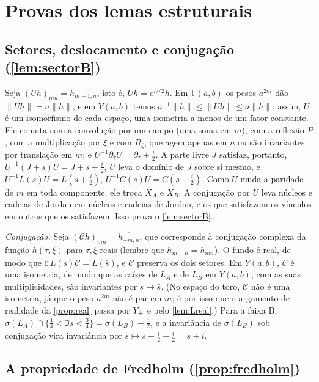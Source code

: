 \section{Provas dos lemas estruturais}\label{app:lemmas}

\subsection{Setores, deslocamento e conjugação (\cref{lem:sectorB})}\label{app:sectors}

Seja $(Uh)_{mn}=h_{m-1,n}$, isto é, $Uh=e^{i\tau/2}h$. Em $\mathbb T(a,b)$ os pesos $a^{2m}$ dão
$\|Uh\|=a\|h\|$, e em $Y(a,b)$ temos $a^{-1}\|h\|\le\|Uh\|\le a\|h\|$; assim, $U$ é um isomorfismo de cada espaço,
uma isometria a menos de um fator constante. Ele comuta com a convolução por um campo (uma soma em $m$), com a reflexão
$P$, com a multiplicação por $\xi$ e com $R_\xi$, que agem apenas em $n$ ou são invariantes por translação em
$m$; e $U^{-1}\partial_\tau U=\partial_\tau+\tfrac i2$. A parte livre $J$ satisfaz, portanto,
$U^{-1}(J+s)U=J+s+\tfrac i2$, $U$ leva o domínio de $J$ sobre si mesmo, e $U^{-1}L(s)U=L(s+\tfrac i2)$,
$U^{-1}C(s)U=C(s+\tfrac i2)$. Como $U$ muda a paridade de $m$ em toda componente, ele troca $X_A$ e $X_B$.
A conjugação por $U$ leva núcleos e cadeias de Jordan em núcleos e cadeias de Jordan, e os que satisfazem os vínculos em
outros que os satisfazem. Isso prova o \cref{lem:sectorB}.

\emph{Conjugação.} Seja $(\mathcal Ch)_{mn}=\overline{h_{-m,n}}$, que corresponde à conjugação complexa da
função $h(\tau,\xi)$ para $\tau,\xi$ reais (lembre que $h_{m,-n}=h_{mn}$). O fundo é real, de modo que
$\mathcal C L(s)\mathcal C=L(\bar s)$, e $\mathcal C$ preserva os dois setores. Em $Y(a,b)$, $\mathcal C$ é uma
isometria, de modo que as raízes de $L_A$ e de $L_B$ em $Y(a,b)$, com as suas multiplicidades, são invariantes por
$s\mapsto\bar s$. (No espaço do toro, $\mathcal C$ não é uma isometria, já que o peso $a^{2m}$ não é par em $m$;
é por isso que o argumento de realidade da \cref{prop:real} passa por $Y_{+}$ e pelo \cref{lem:Lreal}.) Para a faixa B,
$\sigma(L_A)\cap\{\tfrac14<\Im s<\tfrac34\}=\sigma(L_B)+\tfrac i2$, e a invariância de $\sigma(L_B)$ sob
conjugação vira invariância por $s\mapsto\overline{s-\tfrac i2}+\tfrac i2=\bar s+i$.

\subsection{A propriedade de Fredholm (\cref{prop:fredholm})}\label{app:fredholm}

